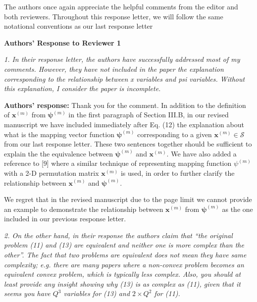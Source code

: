 \documentclass[onecolumn, 11pt, draftclsnofoot]{IEEEtran}
\begin{document}
The authors once again appreciate the helpful comments from the editor and both
reviewers.
Throughout this response letter, we will follow the same notational
conventions as our last response letter

\begin{center}
  {\LARGE \textbf{Authors' Response to Reviewer 1}}
\end{center}


 
\noindent
\emph{1. In their response letter, the authors have successfully addressed most
of my comments. However, they have not included in the paper the explanation
corresponding to the relationship between x variables and psi variables. Without
this explanation, I consider the paper is incomplete.}

\noindent \textbf{Authors' response:} 
Thank you for the comment. In addition to the definition of $\mathbf{x}^{(m)}$
from $\bm{\psi}^{(m)}$ in the first paragraph of Section III.B, in our revised
manuscript we have included immediately after Eq. (12) the explanation about
what is the mapping vector function $\bm{\psi}^{(m)}$ corresponding to a given
$\mathbf{x}^{(m)}\in\mathcal{S}$ from our last response letter. These two
sentences together should be sufficient to explain the the equivalence between
$\bm{\psi}^{(m)}$ and $\mathbf{x}^{(m)}$. We have also added a reference to [9]
where a similar technique of representing mapping function $\psi^{(m)}$ with a
2-D permutation matrix $\mathbf{x}^{(m)}$ is used, in order to further clarify
the relationship between $\mathbf{x}^{(m)}$ and $\bm{\psi}^{(m)}$.

We regret that in the revised manuscript due to the page limit we cannot provide
an example to demonstrate the relationship between $\mathbf{x}^{(m)}$
from $\bm{\psi}^{(m)}$ as the one included in our previous response letter.
\vspace{0.5cm}

\noindent
\emph{2. On the other hand, in their response the authors claim that ``the
original problem (11) and (13) are equivalent and neither one is more complex
than the other''. The fact that two problems are equivalent does not mean they
have same complexity; e.g. there are many papers where a non-convex problem
becomes an equivalent convex problem, which is typically less complex.  Also,
you should at least provide any insight showing why (13) is as complex as (11),
given that it seems you have $Q^3$ variables for (13) and $2\times Q^2$ for
(11).}
\end{document}
